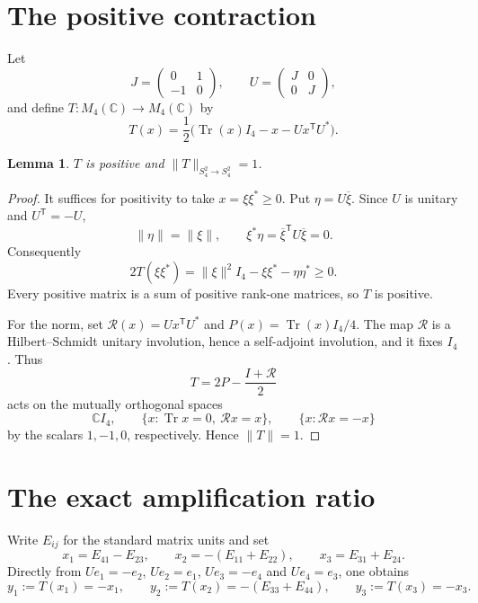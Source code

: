 \documentclass[11pt]{article}
\newtheorem{lemma}{Lemma}
\newcommand{\Mfour}{M_4(\mathbb C)}
\newcommand{\Tr}{\operatorname{Tr}}
\newcommand{\Rmap}{\mathcal R}
\begin{document}
\section{The positive contraction}

Let
\[
 J=\begin{pmatrix}0&1\\-1&0\end{pmatrix},\qquad
 U=\begin{pmatrix}J&0\\0&J\end{pmatrix},
\]
and define $T:\Mfour\to\Mfour$ by
\begin{equation}\label{eq:T}
 T(x)=\frac12\bigl(\Tr(x)I_4-x-Ux^{\mathsf T}U^*\bigr).
\end{equation}

\begin{lemma}\label{lem:positive}
$T$ is positive and $\|T\|_{S_4^2\to S_4^2}=1$.
\end{lemma}

\begin{proof}
It suffices for positivity to take $x=\xi\xi^*\geq0$.  Put
$\eta=U\overline\xi$.  Since $U$ is unitary and $U^{\mathsf T}=-U$,
\[
 \|\eta\|=\|\xi\|,
 \qquad \xi^*\eta=\overline\xi^{\mathsf T}U\overline\xi=0.
\]
Consequently
\[
 2T(\xi\xi^*)=\|\xi\|^2I_4-\xi\xi^*-\eta\eta^*\geq0.
\]
Every positive matrix is a sum of positive rank-one matrices, so $T$ is
positive.

For the norm, set $\Rmap(x)=Ux^{\mathsf T}U^*$ and
$P(x)=\Tr(x)I_4/4$.  The map $\Rmap$ is a Hilbert--Schmidt unitary
involution, hence a self-adjoint involution, and it fixes $I_4$.  Thus
\[
 T=2P-\frac{I+\Rmap}{2}
\]
acts on the mutually orthogonal spaces
\[
 \mathbb CI_4,\qquad
 \{x:\Tr x=0,\ \Rmap x=x\},\qquad
 \{x:\Rmap x=-x\}
\]
by the scalars $1,-1,0$, respectively.  Hence $\|T\|=1$.
\end{proof}

\section{The exact amplification ratio}

Write $E_{ij}$ for the standard matrix units and set
\begin{equation}\label{eq:x}
 x_1=E_{41}-E_{23},\qquad
 x_2=-(E_{11}+E_{22}),\qquad
 x_3=E_{31}+E_{24}.
\end{equation}
Directly from $Ue_1=-e_2$, $Ue_2=e_1$, $Ue_3=-e_4$ and
$Ue_4=e_3$, one obtains
\begin{equation}\label{eq:y}
 y_1:=T(x_1)=-x_1,\qquad
 y_2:=T(x_2)=-(E_{33}+E_{44}),\qquad
 y_3:=T(x_3)=-x_3.
\end{equation}
\end{document}
